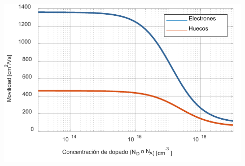\documentclass[10pt,t,aspectratio=169]{beamer}
\begin{document}
\begin{frame}[t]
\begin{columns}
\begin{column}{0.5\textwidth}
\begin{columns}
\begin{column}{0.5\textwidth}
                \end{column}
                
            \end{columns}
            
        \end{column}
        
        \begin{column}{0.5\textwidth}
        
            \centering
            \includegraphics[width=\textwidth]{./figures/movilidad-vs-dopado.pdf}
            
        \end{column}
        
    \end{columns}
    
\end{frame}
\end{document}
